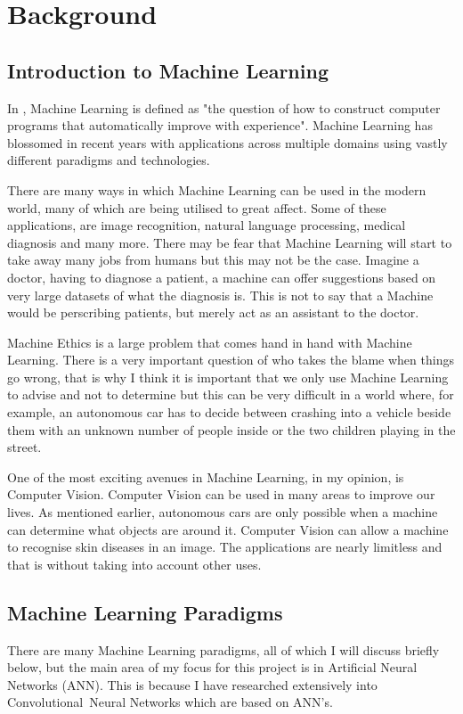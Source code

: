 \chapter{Background}
\label{background}

\section{Introduction to Machine Learning}
In \textcite{MLANN}, Machine Learning is defined as "the question of how to
construct computer programs that automatically improve with experience".
Machine Learning has blossomed in recent years with applications across multiple
domains using vastly different paradigms and technologies.

There are many ways in which Machine Learning can be used in the modern world,
many of which are being utilised to great affect.
Some of these applications, are image recognition, natural language processing,
medical diagnosis and many more.
There may be fear that Machine Learning will start to take away many jobs from
humans but this may not be the case. Imagine a doctor, having to diagnose a
patient, a machine can offer suggestions based on very large datasets of what
the diagnosis is. This is not to say that a Machine would be
perscribing patients, but merely act as an assistant to the doctor.

Machine Ethics is a large problem that comes hand in hand with Machine Learning.
There is a very important question of who takes the blame when things go wrong,
that is why I think it is important that we only use Machine Learning to advise
and not to determine but this can be very difficult in a world where, for
example, an autonomous car has to decide between crashing into a vehicle beside
them with an unknown number of people inside or the two children playing in the
street.

One of the most exciting avenues in Machine Learning, in my opinion, is Computer
Vision. Computer Vision can be used in many areas to improve our lives. As
mentioned earlier, autonomous cars are only possible when a machine can
determine what objects are around it. Computer Vision can allow a machine to
recognise skin diseases in an image. The applications are nearly limitless and
that is without taking into account other uses.

\section{Machine Learning Paradigms}
There are many Machine Learning paradigms, all of which I will
discuss briefly below, but the main area of my focus for this project is in
Artificial Neural Networks (ANN). This is because I have researched extensively into Convolutional Neural Networks which are based on ANN's.
